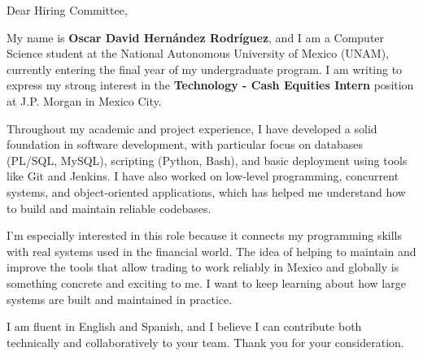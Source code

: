 \begin{cvparagraph}

Dear Hiring Committee,

My name is \textbf{Oscar David Hernández Rodríguez}, and I am a Computer Science student at the National Autonomous University of Mexico (UNAM), currently entering the final year of my undergraduate program. I am writing to express my strong interest in the \textbf{Technology - Cash Equities Intern} position at J.P. Morgan in Mexico City.

Throughout my academic and project experience, I have developed a solid foundation in software development, with particular focus on databases (PL/SQL, MySQL), scripting (Python, Bash), and basic deployment using tools like Git and Jenkins. I have also worked on low-level programming, concurrent systems, and object-oriented applications, which has helped me understand how to build and maintain reliable codebases.

I’m especially interested in this role because it connects my programming skills with real systems used in the financial world. The idea of helping to maintain and improve the tools that allow trading to work reliably in Mexico and globally is something concrete and exciting to me. I want to keep learning about how large systems are built and maintained in practice.

I am fluent in English and Spanish, and I believe I can contribute both technically and collaboratively to your team. Thank you for your consideration.

\end{cvparagraph}
